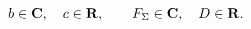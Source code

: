 \begin{equation}
b \in {\bf C}, \quad c \in {\bf R}
, 
\qquad
F_{\Sigma} \in {\bf C}, \quad D \in {\bf R}
. 
\end{equation} 

